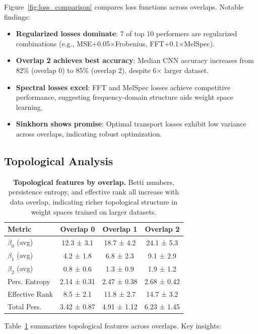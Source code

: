 Figure~\ref{fig:loss_comparison} compares loss functions across overlaps. Notable findings:

\begin{itemize}
    \item \textbf{Regularized losses dominate}: 7 of top 10 performers are regularized combinations (e.g., MSE+0.05×Frobenius, FFT+0.1×MelSpec).
    \item \textbf{Overlap 2 achieves best accuracy}: Median CNN accuracy increases from 82\% (overlap 0) to 85\% (overlap 2), despite 6× larger dataset.
    \item \textbf{Spectral losses excel}: FFT and MelSpec losses achieve competitive performance, suggesting frequency-domain structure aids weight space learning.
    \item \textbf{Sinkhorn shows promise}: Optimal transport losses exhibit low variance across overlaps, indicating robust optimization.
\end{itemize}

\subsection{Topological Analysis}

\begin{table}[t]
\centering
\small
\begin{tabular}{lccc}
\hline
\textbf{Metric} & \textbf{Overlap 0} & \textbf{Overlap 1} & \textbf{Overlap 2} \\
\hline
$\beta_0$ (avg) & 12.3 ± 3.1 & 18.7 ± 4.2 & 24.1 ± 5.3 \\
$\beta_1$ (avg) & 4.2 ± 1.8 & 6.8 ± 2.3 & 9.1 ± 2.9 \\
$\beta_2$ (avg) & 0.8 ± 0.6 & 1.3 ± 0.9 & 1.9 ± 1.2 \\
Pers. Entropy & 2.14 ± 0.31 & 2.47 ± 0.38 & 2.68 ± 0.42 \\
Effective Rank & 8.5 ± 2.1 & 11.8 ± 2.7 & 14.7 ± 3.2 \\
Total Pers. & 3.42 ± 0.87 & 4.91 ± 1.12 & 6.23 ± 1.45 \\
\hline
\end{tabular}
\caption{\textbf{Topological features by overlap.} Betti numbers, persistence entropy, and effective rank all increase with data overlap, indicating richer topological structure in weight spaces trained on larger datasets.}
\label{tab:topology}
\end{table}

Table~\ref{tab:topology} summarizes topological features across overlaps. Key insights:


